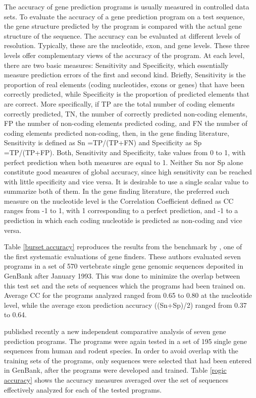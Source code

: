 The accuracy of gene prediction programs is usually measured in
controlled data sets. To evaluate the accuracy of a gene prediction
program on a test sequence, the gene structure predicted by the
program is compared with the actual gene structure of the
sequence. The accuracy can be evaluated at different levels of
resolution. Typically, these are the nucleotide, exon, and gene
levels. These three levels offer complementary views of the accuracy
of the program. At each level, there are two basic measures:
Sensitivity and Specificity, which essentially measure prediction
errors of the first and second kind. Briefly, Sensitivity is the
proportion of real elements (coding nucleotides, exons or genes) that
have been correctly predicted, while Specificity is the proportion of
predicted elements that are correct. More specifically, if TP are the
total number of coding elements correctly predicted, TN, the number of
correctly predicted non-coding elements, FP the number of non-coding
elements predicted coding, and FN the number of coding elements
predicted non-coding, then, in the gene finding literature,
Sensitivity is defined as Sn =TP/(TP+FN) and Specificity as Sp
=TP/(TP+FP). Both, Sensitivity and Specificity, take values from 0 to
1, with perfect prediction when both measures are equal to 1. Neither
Sn nor Sp alone constitute good measures of global accuracy, since
high sensitivity can be reached with little specificity and vice
versa. It is desirable to use a single scalar value to summarize both
of them. In the gene finding literature, the preferred such measure on
the nucleotide level is the Correlation Coefficient defined as CC
ranges from -1 to 1, with 1 corresponding to a perfect prediction, and
-1 to a prediction in which each coding nucleotide is predicted as
non-coding and vice versa.

Table \ref{burset accuracy} reproduces the results from the benchmark
by \cite{burset:1996a}, one of the first systematic evaluations
of gene finders. These authors evaluated seven programs in a set of
570 vertebrate single gene genomic sequences deposited in GenBank
after January 1993. This was done to minimize the overlap between this
test set and the sets of sequences which the programs had been trained
on. Average CC for the programs analyzed ranged from 0.65 to 0.80 at
the nucleotide level, while the average exon prediction accuracy
((Sn+Sp)/2) ranged from 0.37 to 0.64.

\cite{rogic:2001a} published recently a new independent comparative
analysis of seven gene prediction programs. The programs were again
tested in a set of 195 single gene sequences from human and rodent
species. In order to avoid overlap with the training sets of the
programs, only sequences were selected that had been entered in
GenBank, after the programs were developed and trained. Table
\ref{rogic accuracy} shows the accuracy measures averaged over the set
of sequences effectively analyzed for each of the tested programs.

